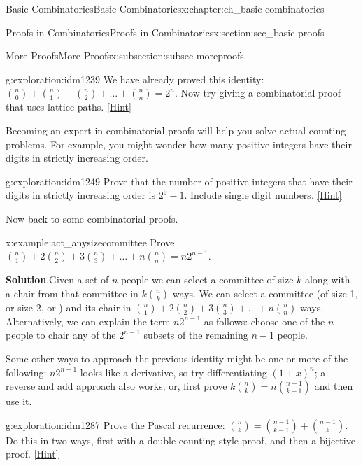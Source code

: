 \documentclass[oneside,10pt,]{book}
\numberwithin{equation}{chapter}
\begin{document}
\begin{chapterptx}{Basic Combinatorics}{}{Basic Combinatorics}{}{}{x:chapter:ch_basic-combinatorics}
\begin{sectionptx}{Proofs in Combinatorics}{}{Proofs in Combinatorics}{}{}{x:section:sec_basic-proofs}
\begin{subsectionptx}{More Proofs}{}{More Proofs}{}{}{x:subsection:subsec-moreproofs}
\begin{exploration}{}{g:exploration:idm1239}%
We have already proved this identity: \(\binom{n}{0} + \binom{n}{1} + \binom{n}{2} + \ldots + \binom{n}{n} = 2^{n}\).  Now try giving a combinatorial proof that uses lattice paths.%
\space\hspace*{0pt}\hfill{\tiny\hyperlink{g:hint:idm1243-back}{[Hint]}}\end{exploration}
Becoming an expert in combinatorial proofs will help you solve actual counting problems.  For example, you might wonder how many positive integers have their digits in strictly increasing order.%
\begin{exploration}{}{g:exploration:idm1249}%
Prove that the number of positive integers that have their digits in strictly increasing order is \(2^{9} - 1\). Include single digit numbers.%
\space\hspace*{0pt}\hfill{\tiny\hyperlink{g:hint:idm1253-back}{[Hint]}}\end{exploration}
Now back to some combinatorial proofs.%
\begin{example}{}{x:example:act_anysizecommittee}%
Prove \(\binom{n}{1} + 2 \binom{n}{2} + 3 \binom{n}{3} + \ldots + n \binom{n}{n} = n2^{n - 1}\).%
\par\smallskip%
\noindent\textbf{Solution}.\hypertarget{g:solution:idm1272}{}\quad{}Given a set of \(n\) people we can select a committee of size \(k\) along with a chair from that committee in \(k \binom{n}{k}\) ways. We can select a committee (of size 1, or size 2, or \textellipsis{}) and its chair in \(\binom{n}{1} + 2 \binom{n}{2} + 3 \binom{n}{3} + \ldots + n \binom{n}{n}\) ways. Alternatively, we can explain the term \(n2^{n - 1}\) as follows: choose one of the \(n\) people to chair any of the \(2^{n - 1}\) subsets of the remaining \(n - 1\) people.%
\end{example}
Some other ways to approach the previous identity might be one or more of the following: \(n2^{n - 1}\) looks like a derivative, so try differentiating \(\left( 1 + x \right)^{n}\); a reverse and add approach also works; or, first prove \(k \binom{n}{k} = n \binom{n - 1}{k - 1}\) and then use it.%
\begin{exploration}{}{g:exploration:idm1287}%
Prove the Pascal recurrence: \(\binom{n}{k} = \binom{n - 1}{k-1} + \binom{n - 1}{k}\).  Do this in two ways, first with a double counting style proof, and then a bijective proof.%
\space\hspace*{0pt}\hfill{\tiny\hyperlink{g:hint:idm1291-back}{[Hint]}}\end{exploration}

\end{subsectionptx}
\end{sectionptx}
\end{chapterptx}
\end{document}
